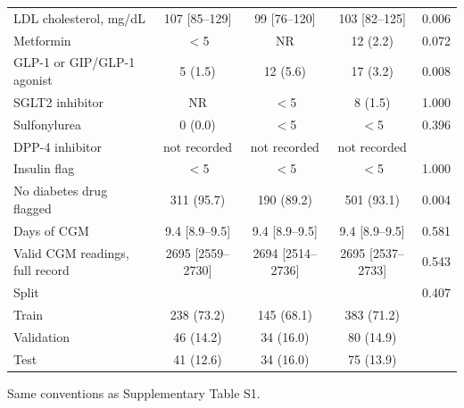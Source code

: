 \begin{table}[htbp]
\begin{tabular}{lcccc}
LDL cholesterol, mg/dL & 107 [85--129] & 99 [76--120] & 103 [82--125] & 0.006 \\
Metformin & $<$5 & NR & 12 (2.2) & 0.072 \\
GLP-1 or GIP/GLP-1 agonist & 5 (1.5) & 12 (5.6) & 17 (3.2) & 0.008 \\
SGLT2 inhibitor & NR & $<$5 & 8 (1.5) & 1.000 \\
Sulfonylurea & 0 (0.0) & $<$5 & $<$5 & 0.396 \\
DPP-4 inhibitor & not recorded & not recorded & not recorded &  \\
Insulin flag & $<$5 & $<$5 & $<$5 & 1.000 \\
No diabetes drug flagged & 311 (95.7) & 190 (89.2) & 501 (93.1) & 0.004 \\
Days of CGM & 9.4 [8.9--9.5] & 9.4 [8.9--9.5] & 9.4 [8.9--9.5] & 0.581 \\
Valid CGM readings, full record & 2695 [2559--2730] & 2694 [2514--2736] & 2695 [2537--2733] & 0.543 \\
Split &  &  &  & 0.407 \\
\hspace{1em}Train & 238 (73.2) & 145 (68.1) & 383 (71.2) &  \\
\hspace{1em}Validation & 46 (14.2) & 34 (16.0) & 80 (14.9) &  \\
\hspace{1em}Test & 41 (12.6) & 34 (16.0) & 75 (13.9) &  \\
\bottomrule
\end{tabular}
\par\smallskip
\begin{minipage}{\linewidth}\scriptsize
Same conventions as Supplementary Table S1.
\end{minipage}
\end{table}

